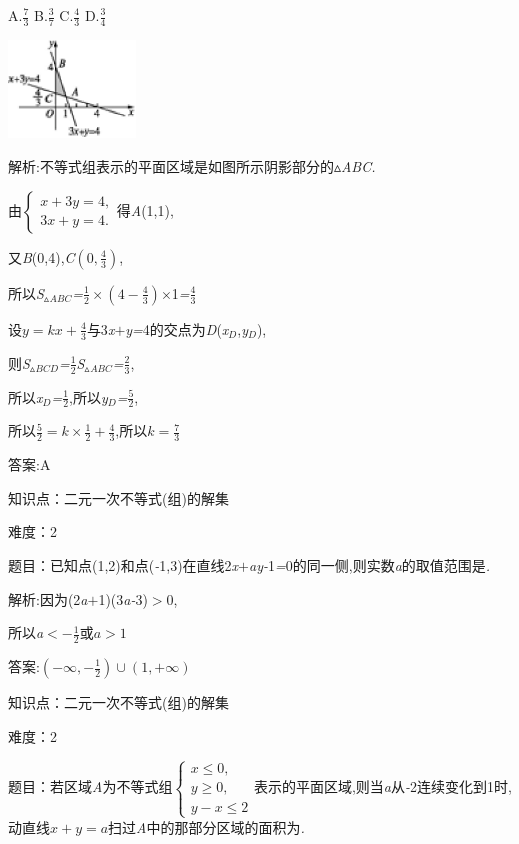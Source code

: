 \documentclass{article} %
\begin{document}
 A.$\frac{7}{3}$ B.$\frac{3}{7}$ C.$\frac{4}{3}$ D.$\frac{3}{4}$

 \includegraphics*[width=1.33in, height=1.03in, keepaspectratio=false]{image1532}

 解析:不等式组表示的平面区域是如图所示阴影部分的$\mathrm{\vartriangle}$\textit{ABC.}

由$
\begin{cases}
x+3y=4,\\
3x+y=4.
\end{cases}$得\textit{A}(1,1),

又\textit{B}(0,4),\textit{C}$(0,\frac{4}{3})$,

所以\textit{S}${}_{\vartriangle }$\textit{${}_{ABC}$=}$\frac{1}{2}\times (4-\frac{4}{3})$\textit{$\times$}1\textit{=}$\frac{4}{3}$

设\textit{$y=kx+\frac{4}{3}$}与3\textit{x$+$y=}4的交点为\textit{D}(\textit{x${}_{D}$},\textit{y${}_{D}$}),

则\textit{S}${}_{\vartriangle }$\textit{${}_{BCD}$=}$\frac{1}{2}$\textit{S}${}_{\vartriangle }$\textit{${}_{ABC}$=}$\frac{2}{3}$,

所以\textit{x${}_{D}$=}$\frac{1}{2}$,所以\textit{y${}_{D}$=}$\frac{5}{2}$,

所以$\frac{5}{2}=k\times \frac{1}{2}+\frac{4}{3}$,所以$k=\frac{7}{3}$

 答案:A

知识点：二元一次不等式(组)的解集

难度：2

 题目：已知点(1,2)和点(\textit{-}1,3)在直线2\textit{x$+$ay-}1\textit{=}0的同一侧,则实数\textit{a}的取值范围是\textit{\underbar{　　　　　　　　}.~}

 解析:因为(2\textit{a$+$}1)(3\textit{a-}3)\textit{$>$}0,

所以\textit{a$<-\frac{1}{2}$}或$a>1$

 答案:$(-\infty,-\frac{1}{2}) \cup (1,+\infty)$

知识点：二元一次不等式(组)的解集

难度：2

 题目：若区域\textit{A}为不等式组$
\begin{cases}
x \le 0,\\
y \ge 0,\\
y-x \le 2
\end{cases}
$表示的平面区域,则当\textit{a}从\textit{-}2连续变化到1时,动直线\textit{$x+y=a$}扫过\textit{A}中的那部分区域的面积为\textit{\underbar{　　　　　}.~}
\end{document}
